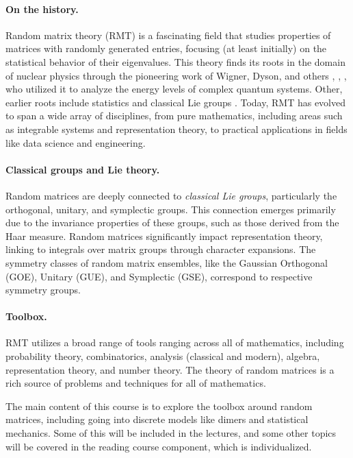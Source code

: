 \documentclass[letterpaper,11pt,oneside,reqno]{book}
\numberwithin{equation}{chapter}  %
\theoremstyle{definition}
\begin{document}
\paragraph{On the history.}
Random matrix theory (RMT) is a fascinating field that
studies
properties of matrices with randomly generated entries,
focusing (at least initially)
on the statistical behavior of their eigenvalues.
This theory finds its roots in the domain of nuclear
physics through the pioneering work of Wigner, Dyson, and
others \cite{wigner1955characteristic},
\cite{dyson1962brownian},
\cite{Dyson1962_III}, who utilized it to analyze the energy levels of complex quantum systems.
Other, earlier roots include statistics \cite{dixon1905generalization}
and classical Lie groups \cite{Hurwitz1897}.
Today, RMT has evolved to span a wide array of disciplines,
from pure mathematics, including areas such as integrable
systems and representation theory, to practical applications
in fields like data science and engineering.

\paragraph{Classical groups and Lie theory.}
Random matrices are deeply connected to \emph{classical Lie groups}, particularly the orthogonal, unitary, and symplectic groups. This connection emerges primarily due to the invariance properties of these groups, such as those derived from the Haar measure.
Random matrices significantly impact representation theory, linking to integrals over matrix groups through character expansions. The symmetry classes of random matrix ensembles, like the Gaussian Orthogonal (GOE), Unitary (GUE), and Symplectic (GSE), correspond to respective symmetry groups.

\paragraph{Toolbox.}
RMT utilizes a broad range of tools ranging across all of mathematics, including probability theory, combinatorics, analysis (classical and modern), algebra, representation theory, and number theory.
The theory of random matrices is a rich source of problems and techniques for all of mathematics.

The main content of this course is to explore the toolbox
around random matrices, including going into discrete models
like dimers and statistical mechanics. Some of this will be included
in the lectures, and some other topics will be covered in the
reading course component, which is individualized.
\end{document}
